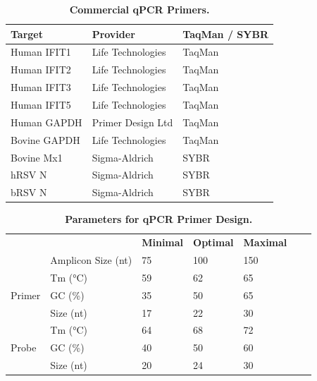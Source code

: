 \begin{table}
\centering
\begin{tabular}{lll}
\toprule
\textbf{Target} & \textbf{Provider} & \textbf{TaqMan / SYBR} \\ \midrule
Human IFIT1     & Life Technologies & TaqMan                 \\ 
Human IFIT2     & Life Technologies & TaqMan                 \\ 
Human IFIT3     & Life Technologies & TaqMan                 \\ 
Human IFIT5     & Life Technologies & TaqMan                 \\ 
Human GAPDH     & Primer Design Ltd & TaqMan                 \\ 
Bovine GAPDH    & Life Technologies & TaqMan                 \\ 
Bovine Mx1      & Sigma-Aldrich     & SYBR                   \\ 
hRSV N          & Sigma-Aldrich     & SYBR                   \\ 
bRSV N          & Sigma-Aldrich     & SYBR                   \\ \bottomrule
\end{tabular}
\caption[Commercial qPCR Primers.]{\textbf{Commercial qPCR Primers.}}
\label{tab:Commercial qPCR Primers Table}
\end{table}

\begin{table}
\centering
\begin{tabular}{lllllll}
                        &                    & \textbf{Minimal} & \textbf{Optimal} & \textbf{Maximal} &  &  \\ \cline{3-5}
                        & Amplicon Size (nt) & 75               & 100              & 150              &  &  \\ \cline{1-5}
\multirow{3}{*}{Primer} & Tm (°C)            & 59               & 62               & 65               &  &  \\ \cline{2-5}
                        & GC (\%)            & 35               & 50               & 65               &  &  \\ \cline{2-5}
                        & Size (nt)          & 17               & 22               & 30               &  &  \\ \cline{1-5}
\multirow{3}{*}{Probe}  & Tm (°C)            & 64               & 68               & 72               &  &  \\ \cline{2-5}
                        & GC (\%)            & 40               & 50               & 60               &  &  \\ \cline{2-5}
                        & Size (nt)          & 20               & 24               & 30               &  &  \\ \cline{1-5}
\end{tabular}
\caption[Parameters for qPCR Primer Design.]{\textbf{Parameters for qPCR Primer Design.}}
\label{tab:Parameters for qPCR Primer Design table}
\end{table}

